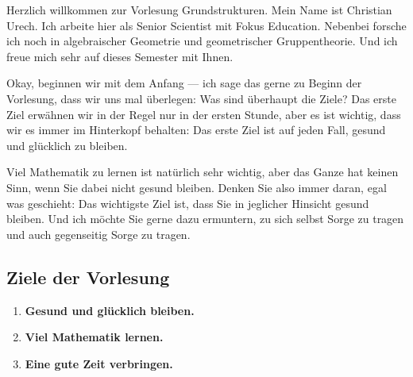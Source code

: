 \begin{spoken-clean}[00:00:00 - 00:01:45]
Herzlich willkommen zur Vorlesung Grundstrukturen. Mein Name ist Christian Urech. Ich arbeite hier als Senior Scientist mit Fokus Education. Nebenbei forsche ich noch in algebraischer Geometrie und geometrischer Gruppentheorie. Und ich freue mich sehr auf dieses Semester mit Ihnen.

Okay, beginnen wir mit dem Anfang --- ich sage das gerne zu Beginn der Vorlesung, dass wir uns mal überlegen: Was sind überhaupt die Ziele? Das erste Ziel erwähnen wir in der Regel nur in der ersten Stunde, aber es ist wichtig, dass wir es immer im Hinterkopf behalten: Das erste Ziel ist auf jeden Fall, gesund und glücklich zu bleiben. 

Viel Mathematik zu lernen ist natürlich sehr wichtig, aber das Ganze hat keinen Sinn, wenn Sie dabei nicht gesund bleiben. Denken Sie also immer daran, egal was geschieht: Das wichtigste Ziel ist, dass Sie in jeglicher Hinsicht gesund bleiben. Und ich möchte Sie gerne dazu ermuntern, zu sich selbst Sorge zu tragen und auch gegenseitig Sorge zu tragen.
\end{spoken-clean}

\subsection{Ziele der Vorlesung}
\begin{math-stroke}
\begin{enumerate}[label=\textbf{(\arabic*)}]
    \item \textbf{Gesund und glücklich bleiben.}
    \item \textbf{Viel Mathematik lernen.}
    \item \textbf{Eine gute Zeit verbringen.}
\end{enumerate}
\end{math-stroke}

